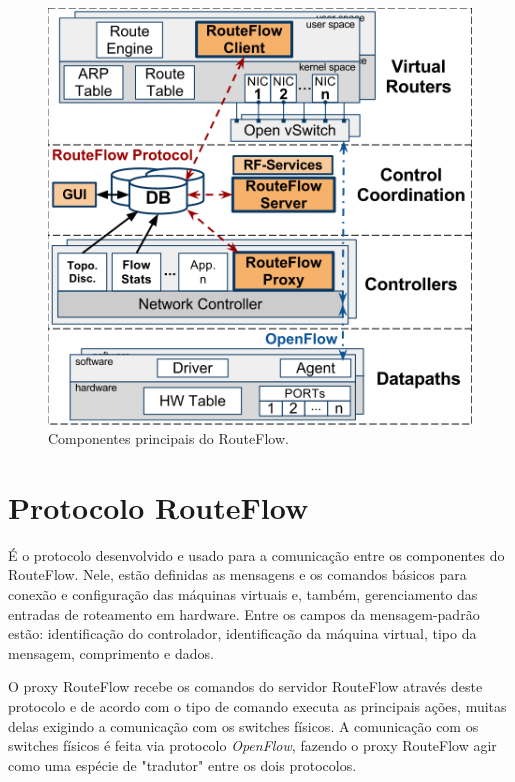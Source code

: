 \begin{figure}[h] 
\centering
\includegraphics[width=150mm]{componentesRouteFlow.png}
\caption{Componentes principais do RouteFlow.}
\label{fig:componentesRouteFlow} 
\end{figure}

\section{Protocolo RouteFlow}

É o protocolo desenvolvido e usado para a comunicação entre
os componentes do RouteFlow. Nele, estão definidas as
mensagens e os comandos básicos para conexão e configuração
das máquinas virtuais e, também, gerenciamento das entradas
de roteamento em hardware. Entre os campos da
mensagem-padrão estão: identificação do controlador,
identificação da máquina virtual, tipo da mensagem,
comprimento e dados. 

O proxy RouteFlow recebe os comandos do
servidor RouteFlow através deste protocolo e de acordo com o
tipo de comando executa as principais ações, muitas delas
exigindo a comunicação com os switches físicos. A
comunicação com os switches físicos é feita via protocolo
\textit{OpenFlow}, fazendo o proxy RouteFlow agir como
uma espécie de "tradutor" entre os dois protocolos.